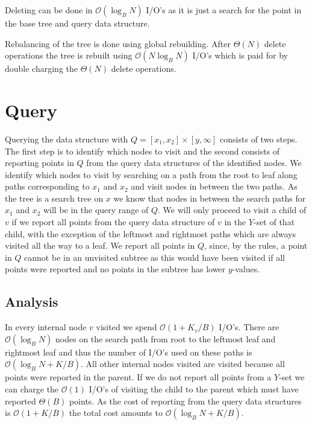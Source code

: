 \documentclass[twoside,11pt,openright]{report}
\begin{document}
Deleting can be done in $\mathcal{O}(\log_B N)$ I/O's as it is just a search for the point in the base tree and query data structure.

Rebalancing of the tree is done using global rebuilding. After $\Theta(N)$ delete operations the tree is rebuilt using $\mathcal{O}(N \log_B N)$ I/O's which is paid for by double charging the $\Theta(N)$ delete operations.
\section{Query}
\label{sec:arge_query}
Querying the data structure with $Q = \left[ x_1, x_2 \right] \times \left[ y, \infty \right]$ consists of two steps. The first step is to identify which nodes to visit and the second consists of reporting points in $Q$ from the query data structures of the identified nodes. 
We identify which nodes to visit by searching on a path from the root to leaf along paths corresponding to $x_1$ and $x_2$ and visit nodes in between the two paths. As the tree is a search tree on $x$ we know that nodes in between the search paths for $x_1$ and $x_2$ will be in the query range of $Q$.
We will only proceed to visit a child of $v$ if we report all points from the query data structure of $v$ in the $Y$-set of that child, with the exception of the leftmost and rightmost paths which are always visited all the way to a leaf.
We report all points in $Q$, since, by the rules, a point in $Q$ cannot be in an unvisited subtree as this would have been visited if all points were reported and no points in the subtree has lower $y$-values.

\subsection{Analysis}
In every internal node $v$ visited we spend $\mathcal{O}(1+K_v/B)$ I/O's. There are $\mathcal{O}(\log_B N)$ nodes on the search path from root to the leftmost leaf and rightmost leaf and thus the number of I/O's used on these paths is $\mathcal{O}(\log_B N + K/B)$. All other internal nodes visited are visited because all points were reported in the parent. If we do not report all points from a $Y$-set we can charge the $\mathcal{O}(1)$ I/O's of visiting the child to the parent which must have reported $\Theta(B)$ points. As the cost of reporting from the query data structures is $\mathcal{O}(1+K/B)$ the total cost amounts to $\mathcal{O}(\log_B N + K/B)$.
\end{document}
